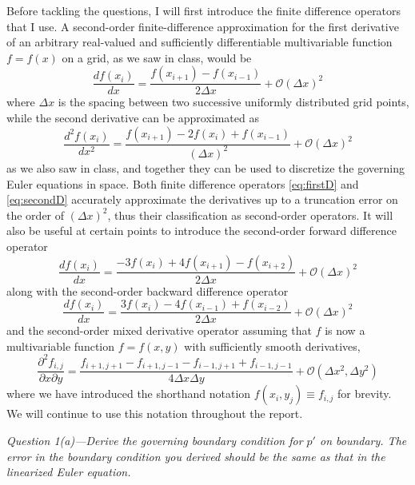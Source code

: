 \documentclass[11pt]{article}
\begin{document}
Before tackling the questions, I will first introduce the finite difference operators that I use. A second-order finite-difference approximation for the first derivative of an arbitrary real-valued and sufficiently differentiable multivariable function $f = f(x)$ on a grid, as we saw in class, would be 
\begin{equation} \label{eq:firstD}
\frac{df(x_i)}{dx} = \frac{f(x_{i+1}) - f(x_{i-1})}{2\Delta x} + \mathcal{O}(\Delta x)^2
\end{equation}
where $\Delta x$ is the spacing between two successive uniformly distributed grid points, while the second derivative can be approximated as
\begin{equation} \label{eq:secondD}
\frac{d^2 f(x_i)}{dx^2} = \frac{f(x_{i+1}) - 2f(x_i) + f(x_{i-1})}{(\Delta x)^2} + \mathcal{O}(\Delta x)^2
\end{equation}
as we also saw in class, and together they can be used to discretize the governing Euler equations in space. Both finite difference operators \eqref{eq:firstD} and \eqref{eq:secondD} accurately approximate the derivatives up to a truncation error on the order of $(\Delta x)^2$, thus their classification as second-order operators. It will also be useful at certain points to introduce the second-order forward difference operator
\begin{equation} \label{eq:firstDforward}
\frac{df(x_i)}{dx} = \frac{-3f(x_{i}) + 4f(x_{i+1}) - f(x_{i+2})}{2\Delta x} + \mathcal{O}(\Delta x)^2
\end{equation}
along with the second-order backward difference operator
\begin{equation} \label{eq:firstDbackward}
\frac{df(x_i)}{dx} = \frac{3f(x_{i}) - 4f(x_{i-1}) + f(x_{i-2})}{2\Delta x} + \mathcal{O}(\Delta x)^2
\end{equation}
and the second-order mixed derivative operator assuming that $f$ is now a multivariable function $f = f(x,y)$ with sufficiently smooth derivatives,
\begin{equation} \label{eq:mixedD}
\frac{\partial^2 f_{i,j}}{\partial x \partial y} = \frac{f_{i+1,j+1} - f_{i+1,j-1} - f_{i-1,j+1} + f_{i-1,j-1}}{4\Delta x \Delta y} + \mathcal{O}(\Delta x^2, \Delta y^2)
\end{equation}
where we have introduced the shorthand notation $f(x_i,y_j) \equiv f_{i,j}$ for brevity. We will continue to use this notation throughout the report. \\

\begin{tcolorbox}
  \textit{Question 1(a)---Derive the governing boundary condition for $p'$ on boundary. The error in the boundary condition you derived should be the same as that in the linearized Euler equation.}
\end{tcolorbox}
\end{document}
